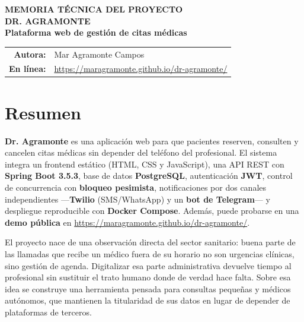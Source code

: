 \documentclass[12pt,a4paper]{report}
\begin{document}
\begin{titlepage}
  \pagestyle{empty}
  \centering
  \vspace*{1.5cm}
  {\Large\bfseries\color{tealdark} MEMORIA TÉCNICA DEL PROYECTO\\[0.8em]}
  \vspace{0.8cm}
  {\Huge\bfseries\color{teal} DR. AGRAMONTE\\[0.4em]}
  {\Large\bfseries\color{teallight} Plataforma web de gestión de citas médicas\\[1.5em]}
  \vfill
  \begin{tabular}{rl}
    \textbf{Autora:} & Mar Agramonte Campos \\
    \textbf{En línea:} & \url{https://maragramonte.github.io/dr-agramonte/} \\
  \end{tabular}
\end{titlepage}

\clearpage
\pagestyle{fancy}
\setcounter{page}{1}

\chapter*{Resumen}

\textbf{Dr. Agramonte} es una aplicación web para que pacientes reserven, consulten y cancelen citas médicas sin depender del teléfono del profesional. El sistema integra un frontend estático (HTML, CSS y JavaScript), una API REST con \textbf{Spring Boot 3.5.3}, base de datos \textbf{PostgreSQL}, autenticación \textbf{JWT}, control de concurrencia con \textbf{bloqueo pesimista}, notificaciones por dos canales independientes —\textbf{Twilio} (SMS/WhatsApp) y un \textbf{bot de Telegram}— y despliegue reproducible con \textbf{Docker Compose}. Además, puede probarse en una \textbf{demo pública} en \url{https://maragramonte.github.io/dr-agramonte/}.

El proyecto nace de una observación directa del sector sanitario: buena parte de las llamadas que recibe un médico fuera de su horario no son urgencias clínicas, sino gestión de agenda. Digitalizar esa parte administrativa devuelve tiempo al profesional sin sustituir el trato humano donde de verdad hace falta. Sobre esa idea se construye una herramienta pensada para consultas pequeñas y médicos autónomos, que mantienen la titularidad de sus datos en lugar de depender de plataformas de terceros.
\end{document}
